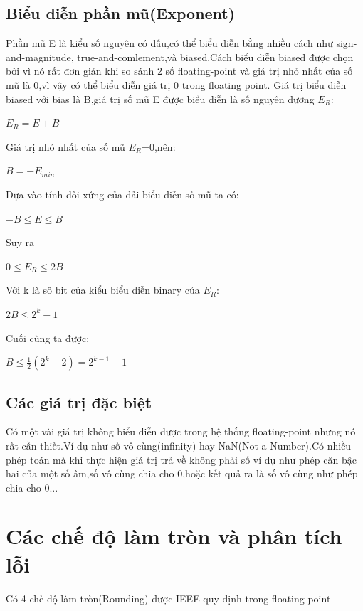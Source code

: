 \documentclass[11pt,a4paper,vietnamese]{report}
\begin{document}
\subsection{Biểu diễn phần mũ(Exponent)}
Phần mũ E là kiểu số nguyên có dấu,có thể biểu diễn bằng nhiều cách như sign-and-magnitude,
true-and-comlement,và biased.Cách biểu diễn biased được chọn bởi vì nó rất đơn giản khi so sánh 2 số floating-point và giá trị nhỏ nhất của số mũ là 0,vì vậy có thể biểu diễn giá trị 0 trong floating point.
Giá trị biểu diễn biased với bias là B,giá trị số mũ E được biểu diễn là số nguyên dương $E_R$:
\begin{center}
$E_R=E+B$
\end{center}
Giá trị nhỏ nhất của số mũ $E_R$=0,nên:
\begin{center}
$B=-E_{min}$
\end{center}
Dựa vào tính đối xứng của dải biểu diễn số mũ ta có:
\begin{center}
$-B\leq E\leq B$
\end{center}
Suy ra
\begin{center}
$0\leq E_R\leq 2B$
\end{center}
Với k là sô bit của kiểu biểu diễn binary của $E_R$:
\begin{center}
$2B\leq 2^k-1$
\end{center}
Cuối cùng ta được:
\begin{center}
$B\leq \frac{1}{2}(2^k-2)=2^{k-1}-1$
\end{center}
\subsection{Các giá trị đặc biệt}
Có một vài giá trị không biểu diễn được trong hệ thống floating-point nhưng nó rất cần thiết.Ví dụ như số vô cùng(infinity) hay NaN(Not a Number).Có nhiều phép toán mà khi thực hiện giá trị trả về không phải số ví dụ như phép căn bậc hai của một số âm,số vô cùng chia cho 0,hoặc kết quả ra là số vô cùng như phép chia cho 0...
\section{Các chế độ làm tròn và phân tích lỗi}
Có 4 chế độ làm tròn(Rounding) được IEEE quy định trong floating-point
\end{document}
